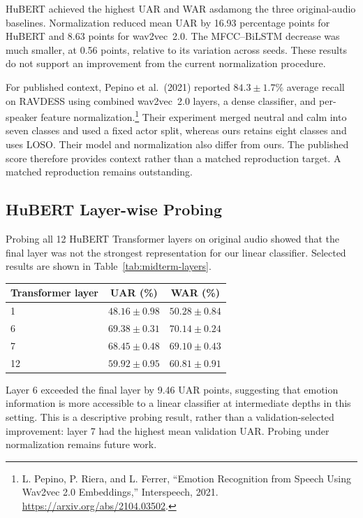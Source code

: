 HuBERT achieved the highest UAR and WAR asdamong the three original-audio baselines. Normalization reduced mean UAR by 16.93 percentage points for HuBERT and 8.63 points for wav2vec~2.0. The MFCC--BiLSTM decrease was much smaller, at 0.56 points, relative to its variation across seeds. These results do not support an improvement from the current normalization procedure.

For published context, Pepino et al.\ (2021) reported $84.3 \pm 1.7\%$ average recall on RAVDESS using combined wav2vec~2.0 layers, a dense classifier, and per-speaker feature normalization.\footnote{L. Pepino, P. Riera, and L. Ferrer, ``Emotion Recognition from Speech Using Wav2vec 2.0 Embeddings,'' Interspeech, 2021. \url{https://arxiv.org/abs/2104.03502}.} Their experiment merged neutral and calm into seven classes and used a fixed actor split, whereas ours retains eight classes and uses LOSO. Their model and normalization also differ from ours. The published score therefore provides context rather than a matched reproduction target. A matched reproduction remains outstanding.

\subsection{HuBERT Layer-wise Probing}

Probing all 12 HuBERT Transformer layers on original audio showed that the final layer was not the strongest representation for our linear classifier. Selected results are shown in Table~\ref{tab:midterm-layers}.

\begin{center}
\begin{tabular}{lcc}
\toprule
\textbf{Transformer layer} & \textbf{UAR (\%)} & \textbf{WAR (\%)} \\
\midrule
1 & $48.16 \pm 0.98$ & $50.28 \pm 0.84$ \\
6 & $69.38 \pm 0.31$ & $70.14 \pm 0.24$ \\
7 & $68.45 \pm 0.48$ & $69.10 \pm 0.43$ \\
12 & $59.92 \pm 0.95$ & $60.81 \pm 0.91$ \\
\bottomrule
\end{tabular}
\label{tab:midterm-layers}
\end{center}

Layer 6 exceeded the final layer by 9.46 UAR points, suggesting that emotion information is more accessible to a linear classifier at intermediate depths in this setting. This is a descriptive probing result, rather than a validation-selected improvement: layer 7 had the highest mean validation UAR. Probing under normalization remains future work.

